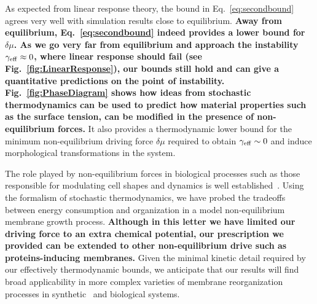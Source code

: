 \documentclass[amsmath,preprintnumbers,10pt,nofootinbib,prl,twocolumn]{revtex4-1}
\begin{document}
As expected from linear response theory, the bound in Eq.~\ref{eq:secondbound} agrees very well with simulation results close to equilibrium. \textbf{ Away from equilibrium, Eq.~\ref{eq:secondbound} indeed provides a lower bound for $\delta \mu$. As we go very far from equilibrium and approach the instability $\gamma_{\rm eff}\approx 0$, where linear response should fail (see Fig.~\ref{fig:LinearResponse}), our bounds still hold and can give a quantitative predictions on the point of instability. Fig.~\ref{fig:PhaseDiagram} shows how ideas from stochastic thermodynamics can be used to predict how material properties such as the surface tension, can be modified in the presence of non-equilibrium forces.} It also provides a thermodynamic lower bound for the minimum non-equilibrium driving force $\delta \mu$ required to obtain $\gamma_{\rm eff}\sim 0$ and induce morphological transformations in the system. 


The role played by non-equilibrium forces in biological processes such as those responsible for modulating cell shapes and dynamics is well established~\cite{McMahon2005,Stachowiak2012,Chen2016,Turlier2016,Rao2001,Solon2006}. Using the formalism of stochastic thermodynamics, we have probed the tradeoffs between energy consumption and organization in a model non-equilibrium membrane growth process. \textbf{Although in this letter we have limited our driving force to an extra chemical potential, our prescription we provided can be extended to other non-equilibrium drive such as proteins-inducing membranes.} Given the minimal kinetic detail required by our effectively thermodynamic bounds, we anticipate that our results will find broad applicability in more complex varieties of membrane reorganization processes in synthetic~\cite{Zwicker2017} and biological systems. 
\end{document}
